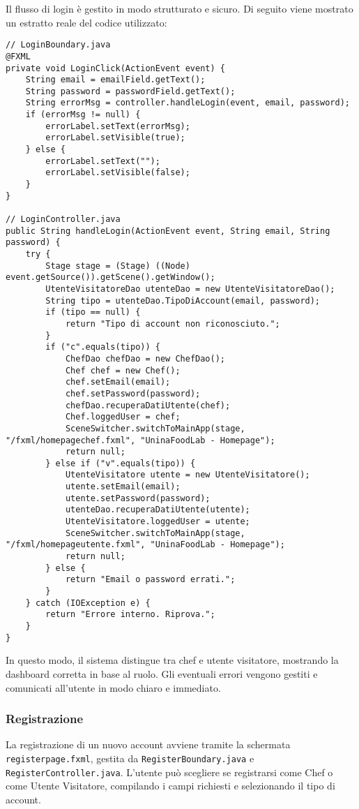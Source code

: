 Il flusso di login è gestito in modo strutturato e sicuro. Di seguito viene mostrato un estratto reale del codice utilizzato:
\begin{verbatim}
// LoginBoundary.java
@FXML
private void LoginClick(ActionEvent event) {
    String email = emailField.getText();
    String password = passwordField.getText();
    String errorMsg = controller.handleLogin(event, email, password);
    if (errorMsg != null) {
        errorLabel.setText(errorMsg);
        errorLabel.setVisible(true);
    } else {
        errorLabel.setText("");
        errorLabel.setVisible(false);
    }
}

// LoginController.java
public String handleLogin(ActionEvent event, String email, String password) {
    try {
        Stage stage = (Stage) ((Node) event.getSource()).getScene().getWindow();
        UtenteVisitatoreDao utenteDao = new UtenteVisitatoreDao();
        String tipo = utenteDao.TipoDiAccount(email, password);
        if (tipo == null) {
            return "Tipo di account non riconosciuto.";
        }
        if ("c".equals(tipo)) {
            ChefDao chefDao = new ChefDao();
            Chef chef = new Chef();
            chef.setEmail(email);
            chef.setPassword(password);
            chefDao.recuperaDatiUtente(chef);
            Chef.loggedUser = chef;
            SceneSwitcher.switchToMainApp(stage, "/fxml/homepagechef.fxml", "UninaFoodLab - Homepage");
            return null;
        } else if ("v".equals(tipo)) {
            UtenteVisitatore utente = new UtenteVisitatore();
            utente.setEmail(email);
            utente.setPassword(password);
            utenteDao.recuperaDatiUtente(utente);
            UtenteVisitatore.loggedUser = utente;
            SceneSwitcher.switchToMainApp(stage, "/fxml/homepageutente.fxml", "UninaFoodLab - Homepage");
            return null;
        } else {
            return "Email o password errati.";
        }
    } catch (IOException e) {
        return "Errore interno. Riprova.";
    }
}
\end{verbatim}

In questo modo, il sistema distingue tra chef e utente visitatore, mostrando la dashboard corretta in base al ruolo. Gli eventuali errori vengono gestiti e comunicati all’utente in modo chiaro e immediato.

\subsubsection{Registrazione}
La registrazione di un nuovo account avviene tramite la schermata \texttt{registerpage.fxml}, gestita da \texttt{RegisterBoundary.java} e \texttt{RegisterController.java}. L’utente può scegliere se registrarsi come Chef o come Utente Visitatore, compilando i campi richiesti e selezionando il tipo di account.

